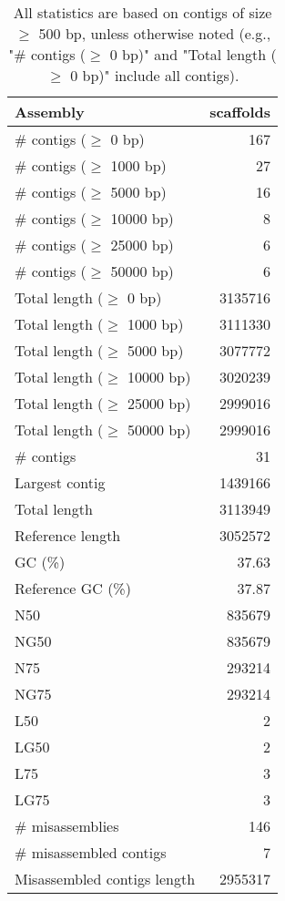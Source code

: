 \documentclass[12pt,a4paper]{article}
\begin{document}
\begin{table}[ht]
\begin{center}
\caption{All statistics are based on contigs of size $\geq$ 500 bp, unless otherwise noted (e.g., "\# contigs ($\geq$ 0 bp)" and "Total length ($\geq$ 0 bp)" include all contigs).}
\begin{tabular}{|l*{1}{|r}|}
\hline
Assembly & scaffolds \\ \hline
\# contigs ($\geq$ 0 bp) & 167 \\ \hline
\# contigs ($\geq$ 1000 bp) & 27 \\ \hline
\# contigs ($\geq$ 5000 bp) & 16 \\ \hline
\# contigs ($\geq$ 10000 bp) & 8 \\ \hline
\# contigs ($\geq$ 25000 bp) & 6 \\ \hline
\# contigs ($\geq$ 50000 bp) & 6 \\ \hline
Total length ($\geq$ 0 bp) & 3135716 \\ \hline
Total length ($\geq$ 1000 bp) & 3111330 \\ \hline
Total length ($\geq$ 5000 bp) & 3077772 \\ \hline
Total length ($\geq$ 10000 bp) & 3020239 \\ \hline
Total length ($\geq$ 25000 bp) & 2999016 \\ \hline
Total length ($\geq$ 50000 bp) & 2999016 \\ \hline
\# contigs & 31 \\ \hline
Largest contig & 1439166 \\ \hline
Total length & 3113949 \\ \hline
Reference length & 3052572 \\ \hline
GC (\%) & 37.63 \\ \hline
Reference GC (\%) & 37.87 \\ \hline
N50 & 835679 \\ \hline
NG50 & 835679 \\ \hline
N75 & 293214 \\ \hline
NG75 & 293214 \\ \hline
L50 & 2 \\ \hline
LG50 & 2 \\ \hline
L75 & 3 \\ \hline
LG75 & 3 \\ \hline
\# misassemblies & 146 \\ \hline
\# misassembled contigs & 7 \\ \hline
Misassembled contigs length & 2955317 \\ \hline

\end{tabular}
\end{center}
\end{table}
\end{document}
